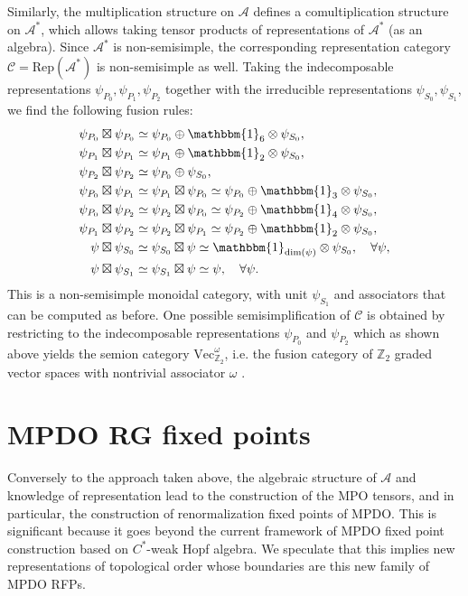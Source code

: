 \documentclass[prx, twocolumn, superscriptaddress, dvipsnames]{revtex4-2}
\theoremstyle{definition}
\newcommand{\bo}{\mathbbm{1}}
\newcommand{\mA}{\mathcal{A}}
\begin{document}
Similarly, the multiplication structure on $\mA$ defines a comultiplication structure on $\mA^*$, which allows taking tensor products of representations of $\mA^*$ (as an algebra). Since $\mA^*$ is non-semisimple, the corresponding representation category $\mathcal C = \text{Rep}(\mA^*)$ is non-semisimple as well. Taking the indecomposable representations $\psi_{P_0}, \psi_{P_1}, \psi_{P_2}$ together with the irreducible representations $\psi_{S_0}, \psi_{S_1}$, we find the following fusion rules:
\begin{align*}
    \psi_{P_0} &\boxtimes \psi_{P_0} \simeq \psi_{P_0} \oplus \bo_6 \otimes \psi_{S_0},\\
    \psi_{P_1} &\boxtimes \psi_{P_1} \simeq \psi_{P_1} \oplus \bo_2 \otimes \psi_{S_0},\\
    \psi_{P_2} &\boxtimes \psi_{P_2} \simeq \psi_{P_0} \oplus \psi_{S_0},\\
    \psi_{P_0} &\boxtimes \psi_{P_1} \simeq \psi_{P_1} \boxtimes \psi_{P_0} \simeq \psi_{P_0} \oplus \bo_3 \otimes \psi_{S_0},\\
    \psi_{P_0} &\boxtimes \psi_{P_2} \simeq \psi_{P_2} \boxtimes \psi_{P_0} \simeq \psi_{P_2} \oplus \bo_4 \otimes \psi_{S_0},\\
    \psi_{P_1} &\boxtimes \psi_{P_2} \simeq \psi_{P_2} \boxtimes \psi_{P_1} \simeq \psi_{P_2} \oplus \bo_2 \otimes \psi_{S_0},\\
    \psi &\boxtimes \psi_{S_0} \simeq \psi_{S_0} \boxtimes \psi \simeq \bo_{\text{dim}(\psi)} \otimes \psi_{S_0}, \quad \forall \psi,\\
    \psi &\boxtimes \psi_{S_1} \simeq \psi_{S_1} \boxtimes \psi \simeq \psi, \quad \forall \psi.
\end{align*}
This is a non-semisimple monoidal category, with unit $\psi_{S_1}$ and associators that can be computed as before. One possible semisimplification of $\mathcal C$ is obtained by restricting to the indecomposable representations $\psi_{P_0}$ and $\psi_{P_2}$ which as shown above yields the semion category $\text{Vec}_{\mathbb Z_2}^\omega$, i.e. the fusion category of $\mathbb Z_2$ graded vector spaces with nontrivial associator $\omega$ \cite{etingof2015tensor}.

\section{MPDO RG fixed points}
\label{sec:mpo-reconstruction}
Conversely to the approach taken above, the algebraic structure of $\mA$ and knowledge of representation lead to the construction of the MPO tensors, and in particular, the construction of renormalization fixed points of MPDO. This is significant because it goes beyond the current framework of MPDO fixed point construction based on $C^*$-weak Hopf algebra. We speculate that this implies new representations of topological order whose boundaries are this new family of MPDO RFPs. 
\end{document}

